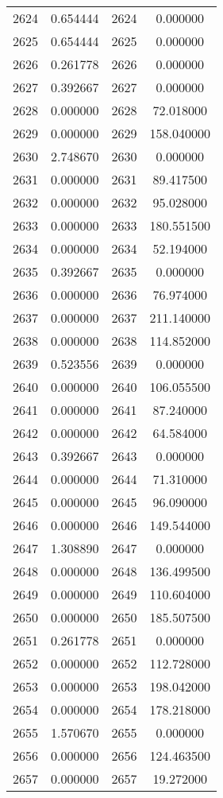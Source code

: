 \documentclass[12pt]{article}
\begin{document}
\begin{longtable}{@{}cccc@{}}
2624 & 0.654444 & 2624 & 0.000000 \\
2625 & 0.654444 & 2625 & 0.000000 \\
2626 & 0.261778 & 2626 & 0.000000 \\
2627 & 0.392667 & 2627 & 0.000000 \\
2628 & 0.000000 & 2628 & 72.018000 \\
2629 & 0.000000 & 2629 & 158.040000 \\
2630 & 2.748670 & 2630 & 0.000000 \\
2631 & 0.000000 & 2631 & 89.417500 \\
2632 & 0.000000 & 2632 & 95.028000 \\
2633 & 0.000000 & 2633 & 180.551500 \\
2634 & 0.000000 & 2634 & 52.194000 \\
2635 & 0.392667 & 2635 & 0.000000 \\
2636 & 0.000000 & 2636 & 76.974000 \\
2637 & 0.000000 & 2637 & 211.140000 \\
2638 & 0.000000 & 2638 & 114.852000 \\
2639 & 0.523556 & 2639 & 0.000000 \\
2640 & 0.000000 & 2640 & 106.055500 \\
2641 & 0.000000 & 2641 & 87.240000 \\
2642 & 0.000000 & 2642 & 64.584000 \\
2643 & 0.392667 & 2643 & 0.000000 \\
2644 & 0.000000 & 2644 & 71.310000 \\
2645 & 0.000000 & 2645 & 96.090000 \\
2646 & 0.000000 & 2646 & 149.544000 \\
2647 & 1.308890 & 2647 & 0.000000 \\
2648 & 0.000000 & 2648 & 136.499500 \\
2649 & 0.000000 & 2649 & 110.604000 \\
2650 & 0.000000 & 2650 & 185.507500 \\
2651 & 0.261778 & 2651 & 0.000000 \\
2652 & 0.000000 & 2652 & 112.728000 \\
2653 & 0.000000 & 2653 & 198.042000 \\
2654 & 0.000000 & 2654 & 178.218000 \\
2655 & 1.570670 & 2655 & 0.000000 \\
2656 & 0.000000 & 2656 & 124.463500 \\
2657 & 0.000000 & 2657 & 19.272000 \\

\end{longtable}
\end{document}
